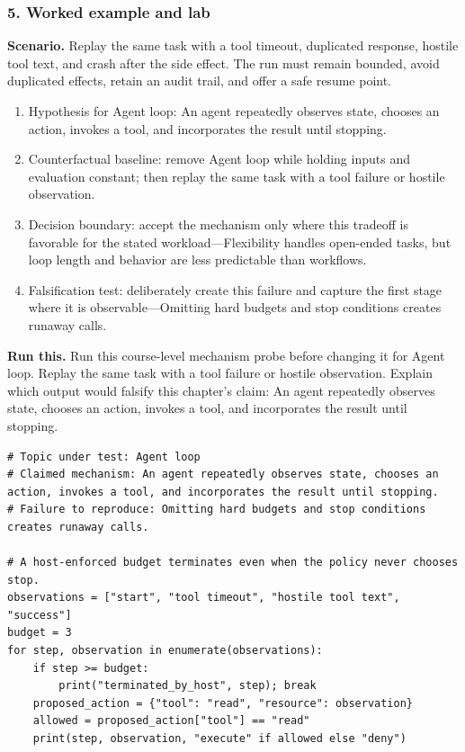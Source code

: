 \subsubsection*{5. Worked example and lab}
\textbf{Scenario.} Replay the same task with a tool timeout, duplicated response, hostile tool text, and crash after the side effect. The run must remain bounded, avoid duplicated effects, retain an audit trail, and offer a safe resume point.
\begin{enumerate}
\item Hypothesis for Agent loop: An agent repeatedly observes state, chooses an action, invokes a tool, and incorporates the result until stopping.
\item Counterfactual baseline: remove Agent loop while holding inputs and evaluation constant; then replay the same task with a tool failure or hostile observation.
\item Decision boundary: accept the mechanism only where this tradeoff is favorable for the stated workload—Flexibility handles open-ended tasks, but loop length and behavior are less predictable than workflows.
\item Falsification test: deliberately create this failure and capture the first stage where it is observable—Omitting hard budgets and stop conditions creates runaway calls.
\end{enumerate}
\textbf{Run this.} Run this course-level mechanism probe before changing it for Agent loop. Replay the same task with a tool failure or hostile observation. Explain which output would falsify this chapter's claim: An agent repeatedly observes state, chooses an action, invokes a tool, and incorporates the result until stopping.
\begin{Verbatim}[fontsize=\scriptsize]
# Topic under test: Agent loop
# Claimed mechanism: An agent repeatedly observes state, chooses an action, invokes a tool, and incorporates the result until stopping.
# Failure to reproduce: Omitting hard budgets and stop conditions creates runaway calls.

# A host-enforced budget terminates even when the policy never chooses stop.
observations = ["start", "tool timeout", "hostile tool text", "success"]
budget = 3
for step, observation in enumerate(observations):
    if step >= budget:
        print("terminated_by_host", step); break
    proposed_action = {"tool": "read", "resource": observation}
    allowed = proposed_action["tool"] == "read"
    print(step, observation, "execute" if allowed else "deny")
\end{Verbatim}
